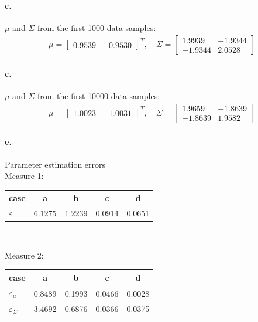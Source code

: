 \documentclass[a4paper]{article}
\begin{document}
\paragraph{c.} $\mu$ and $\Sigma$ from the first 1000 data samples: \\
\begin{align*}
	\mu = \begin{bmatrix}
		0.9539 & -0.9530
	\end{bmatrix}^{T}, \quad
	\Sigma = \begin{bmatrix}
		 1.9939  & -1.9344 \\
		-1.9344  &  2.0528
	\end{bmatrix}
\end{align*}

\paragraph{c.} $\mu$ and $\Sigma$ from the first 10000 data samples: \\
\begin{align*}
	\mu = \begin{bmatrix}
		1.0023 & -1.0031
	\end{bmatrix}^{T}, \quad
	\Sigma = \begin{bmatrix}
		 1.9659  & -1.8639 \\
		-1.8639  &  1.9582
	\end{bmatrix}
\end{align*}

\paragraph{e.} Parameter estimation errors \\

Measure 1:
	\begin{tabular}{l *{4}{c}}
			case      &   a    &   b    &   c    &   d    \\ \hline
		$\varepsilon$ & 6.1275 & 1.2239 & 0.0914 & 0.0651
	\end{tabular} \\
\vspace{2em}
 
Measure 2: 
	\begin{tabular}{l *{4}{c}}
				case            &   a    &   b    &   c    &   d    \\ \hline
		$\varepsilon _{\mu}$    & 0.8489 & 0.1993 & 0.0466 & 0.0028 \\ 
		$\varepsilon _{\Sigma}$ & 3.4692 & 0.6876 & 0.0366 & 0.0375 
	\end{tabular} \\
\vspace{2em}
\end{document}
